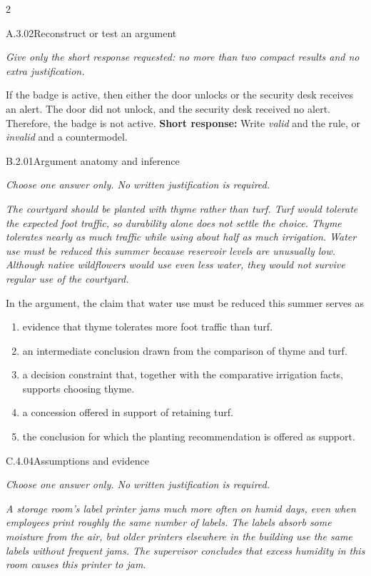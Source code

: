 \documentclass[9pt]{extarticle}
\newcommand{\choice}[1]{\item #1}
\begin{document}
\begin{multicols}{2}
\begin{DenseCoreProblem}{A.3.02}{Reconstruct or test an argument}
{\scriptsize\textit{Give only the short response requested: no more than two compact results and no extra justification.}\par}
If the badge is active, then either the door unlocks or the security desk receives an alert. The door did not unlock, and the security desk received no alert. Therefore, the badge is not active.
\textbf{Short response:} Write \emph{valid} and the rule, or \emph{invalid} and a countermodel.
\end{DenseCoreProblem}
\begin{DenseCoreProblem}{B.2.01}{Argument anatomy and inference}
{\scriptsize\textit{Choose one answer only. No written justification is required.}\par}
\emph{The courtyard should be planted with thyme rather than turf. Turf would tolerate the expected foot traffic, so durability alone does not settle the choice. Thyme tolerates nearly as much traffic while using about half as much irrigation. Water use must be reduced this summer because reservoir levels are unusually low. Although native wildflowers would use even less water, they would not survive regular use of the courtyard.}

In the argument, the claim that water use must be reduced this summer serves as
\begin{enumerate}[label=(\alph*)]
  \choice{evidence that thyme tolerates more foot traffic than turf.}
  \choice{an intermediate conclusion drawn from the comparison of thyme and turf.}
  \choice{a decision constraint that, together with the comparative irrigation facts, supports choosing thyme.}
  \choice{a concession offered in support of retaining turf.}
  \choice{the conclusion for which the planting recommendation is offered as support.}
\end{enumerate}
\end{DenseCoreProblem}
\columnbreak
\begin{DenseCoreProblem}{C.4.04}{Assumptions and evidence}
{\scriptsize\textit{Choose one answer only. No written justification is required.}\par}
\emph{A storage room's label printer jams much more often on humid days, even when employees print roughly the same number of labels. The labels absorb some moisture from the air, but older printers elsewhere in the building use the same labels without frequent jams. The supervisor concludes that excess humidity in this room causes this printer to jam.}


\end{DenseCoreProblem}
\end{multicols}
\end{document}
